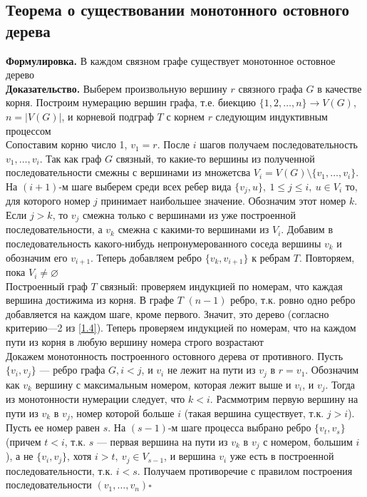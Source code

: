 \documentclass[a4paper]{article}
\begin{document}
\subsection{Теорема о существовании монотонного остовного дерева}
\textbf{Формулировка.} В каждом связном графе существует монотонное остовное дерево\\[2mm]
\indent\textbf{Доказательство.} Выберем произвольную вершину $r$ связного графа $G$ в качестве корня. Построим нумерацию вершин графа, т.е. биекцию $\{1,2,\ldots,n\}\to V(G)$, $n=|V(G)|$, и корневой подграф $T$ с корнем $r$ следующим индуктивным процессом\\[2mm]
\indent Сопоставим корню число 1, $v_1=r$. После $i$ шагов получаем последовательность $v_1,\ldots,v_i$. Так как граф $G$ связный, то какие-то вершины из полученной последовательности смежны с вершинами из множетсва $V_i=V(G)\setminus\{v_1,\ldots,v_i\}$. На $(i+1)$-м шаге выберем среди всех ребер вида $\{v_j,u\},\ 1\leqslant j\leqslant i,\ u\in V_i$ то, для которого номер $j$ принимает наибольшее значение. Обозначим этот номер $k$. Если $j>k$, то $v_j$ смежна только с вершинами из уже построенной последовательности, а $v_k$ смежна с какими-то вершинами из $V_i$. Добавим в последовательность какого-нибудь непронумерованного соседа вершины $v_k$ и обозначим его $v_{i+1}$. Теперь добавляем ребро $\{v_k,v_{i+1}\}$ к ребрам $T$. Повторяем, пока $V_i\ne\varnothing$\\[2mm]
\indent Построенный граф $T$ связный: проверяем индукцией по номерам, что каждая вершина достижима из корня. В графе $T$ $(n-1)$ ребро, т.к. ровно одно ребро добавляется на каждом шаге, кроме первого. Значит, это дерево (согласно критерию—2 из \ref{1.4}). Теперь проверяем индукцией по номерам, что на каждом пути из корня в любую вершину номера строго возрастают\\[2mm]
\indent Докажем монотонность построенного остовного дерева от противного. Пусть $\{v_i,v_j\}$ — ребро графа $G,i<j$, и $v_i$ не лежит на пути из $v_j$ в $r=v_1$. Обозначим как $v_k$ вершину с максимальным номером, которая лежит выше и $v_i$, и $v_j$. Тогда из монотонности нумерации следует, что $k<i$. Расммотрим первую вершину на пути из $v_k$ в $v_j$, номер которой больше $i$ (такая вершина существует, т.к. $j>i$). Пусть ее номер равен $s$. На $(s-1)$-м шаге процесса выбрано ребро $\{v_t,v_s\}$ (причем $t<i$, т.к. $s$ — первая вершина на пути из $v_k$ в $v_j$ с номером, большим $i$), а не $\{v_i,v_j\}$, хотя $i>t,\ v_j\in V_{s-1}$, и вершина $v_i$ уже есть в построенной последовательности, т.к. $i<s$. Получаем противоречие с правилом построения последовательности $(v_1,\ldots,v_n)$\hfill$\square$
\end{document}
